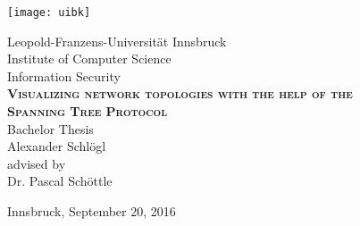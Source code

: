 \begin{titlepage}

    \begin{center}

        \texttt{[image: uibk]}

        \large Leopold-Franzens-Universit\"at Innsbruck\\
        [0.5cm]  

        \large Institute of Computer Science\\Information Security\\
        [3cm]

        \textsc{\large\textbf{Visualizing network topologies with the help of the\\
        Spanning Tree Protocol}}\\
        Bachelor Thesis\\
        [2cm]

        Alexander Schlögl\\
        [3.5cm]

        advised by\\
        Dr. Pascal Schöttle\\

        \vfill

        Innsbruck, September 20, 2016

    \end{center}

\end{titlepage}


